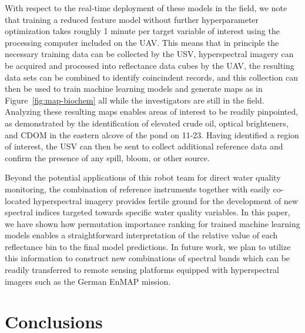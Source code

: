 \documentclass[remotesensing,article,submit,pdftex,moreauthors]{Definitions/mdpi}
\begin{document}
With respect to the real-time deployment of these models in the field, we note that training a reduced feature model without further hyperparameter optimization takes roughly 1 minute per target variable of interest using the processing computer included on the UAV. This means that in principle the necessary training data can be collected by the USV, hyperspectral imagery can be acquired and processed into reflectance data cubes by the UAV, the resulting data sets can be combined to identify coincindent records, and this collection can then be used to train machine learning models and generate maps as in Figure~\ref{fig:map-biochem} all while the investigators are still in the field. Analyzing these resulting maps enables areas of interest to be readily pinpointed, as demonstrated by the identification of elevated crude oil, optical brighteners, and CDOM in the eastern alcove of the pond on 11-23. Having identified a region of interest, the USV can then be sent to collect additional reference data and confirm the presence of any spill, bloom, or other source.

Beyond the potential applications of this robot team for direct water quality monitoring, the combination of reference instruments together with easily co-located hyperspectral imagery provides fertile ground for the development of new spectral indices targeted towards specific water quality variables. In this paper, we have shown how permutation importance ranking for trained machine learning models enables a straightforward interpretation of the relative value of each reflectance bin to the final model predictions. In future work, we plan to utilize this information to construct new combinations of spectral bands which can be readily transferred to remote sensing platforms equipped with hyperspectral imagers such as the German EnMAP mission.




\section{Conclusions}
\end{document}

